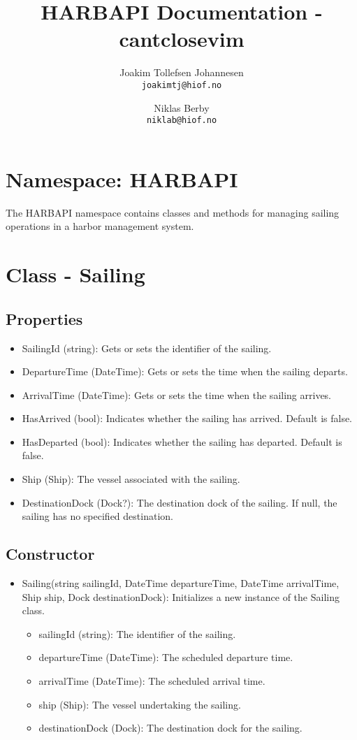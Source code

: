 \documentclass[12pt]{article}
\title{HARBAPI Documentation - cantclosevim}
\author{
    Joakim Tollefsen Johannesen\\
    \texttt{joakimtj@hiof.no}
    \and
    Niklas Berby\\
    \texttt{niklab@hiof.no}
}
\begin{document}
\maketitle

\section*{Namespace: HARBAPI}

The HARBAPI namespace contains classes and methods for managing sailing operations in a harbor management system.

\section*{Class - Sailing}

\subsection*{Properties}
\begin{itemize}
    \item SailingId (string): Gets or sets the identifier of the sailing.
    \item DepartureTime (DateTime): Gets or sets the time when the sailing departs.
    \item ArrivalTime (DateTime): Gets or sets the time when the sailing arrives.
    \item HasArrived (bool): Indicates whether the sailing has arrived. Default is false.
    \item HasDeparted (bool): Indicates whether the sailing has departed. Default is false.
    \item Ship (Ship): The vessel associated with the sailing.
    \item DestinationDock (Dock?): The destination dock of the sailing. If null, the sailing has no specified destination.
\end{itemize}
\subsection*{Constructor}
\begin{itemize}
    \item Sailing(string sailingId, DateTime departureTime, DateTime arrivalTime, Ship ship, Dock destinationDock): Initializes a new instance of the Sailing class.
    \begin{itemize}
        \item sailingId (string): The identifier of the sailing.
        \item departureTime (DateTime): The scheduled departure time.
        \item arrivalTime (DateTime): The scheduled arrival time.
        \item ship (Ship): The vessel undertaking the sailing.
        \item destinationDock (Dock): The destination dock for the sailing.
    \end{itemize}
\end{itemize}
\end{document}
